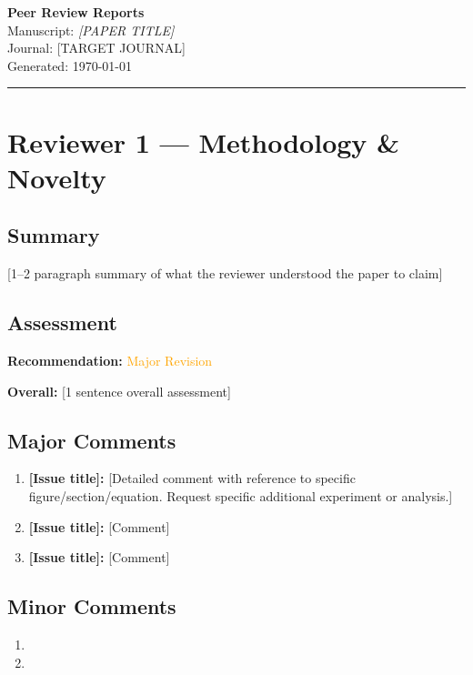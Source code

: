 \documentclass[11pt, a4paper]{article}
\begin{document}
\begin{center}
  {\LARGE\bfseries Peer Review Reports}\\[0.5em]
  {\large Manuscript: \textit{[PAPER TITLE]}}\\[0.3em]
  {\large Journal: [TARGET JOURNAL]}\\[0.3em]
  {\small Generated: \today}
\end{center}

\vspace{1em}
\hrule
\vspace{1em}

\section{Reviewer 1 — Methodology \& Novelty}

\subsection*{Summary}
[1–2 paragraph summary of what the reviewer understood the paper to claim]

\subsection*{Assessment}
\textbf{Recommendation:} \textcolor{orange}{Major Revision} %

\textbf{Overall:} [1 sentence overall assessment]

\subsection*{Major Comments}
\begin{enumerate}[leftmargin=*, label=\textbf{M\arabic*.}]
  \item \textbf{[Issue title]:} [Detailed comment with reference to specific figure/section/equation. Request specific additional experiment or analysis.]
  \item \textbf{[Issue title]:} [Comment]
  \item \textbf{[Issue title]:} [Comment]
\end{enumerate}

\subsection*{Minor Comments}
\begin{enumerate}[leftmargin=*, label=\textbf{m\arabic*.}]
  \item [Minor comment]
  \item [Minor comment]
\end{enumerate}
\end{document}
